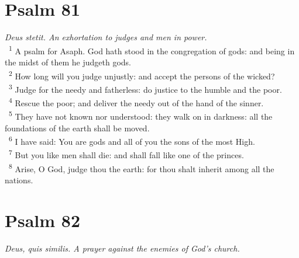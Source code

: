 \documentclass[a5paper,12pt]{article}
\begin{document}
\begin{multicols*}{2}
\section{Psalm 81}
\label{sec:org1b11241}
\emph{Deus stetit. An exhortation to judges and men in power.}\\

~\textsuperscript{1} A psalm for Asaph. God hath stood in the congregation of gods: and being in the midst of them he judgeth gods.\\
~\textsuperscript{2} How long will you judge unjustly: and accept the persons of the wicked?\\
~\textsuperscript{3} Judge for the needy and fatherless: do justice to the humble and the poor.\\
~\textsuperscript{4} Rescue the poor; and deliver the needy out of the hand of the sinner.\\
~\textsuperscript{5} They have not known nor understood: they walk on in darkness: all the foundations of the earth shall be moved.\\
~\textsuperscript{6} I have said: You are gods and all of you the sons of the most High.\\
~\textsuperscript{7} But you like men shall die: and shall fall like one of the princes.\\
~\textsuperscript{8} Arise, O God, judge thou the earth: for thou shalt inherit among all the nations.\\

\section{Psalm 82}
\label{sec:org0f40417}
\emph{Deus, quis similis. A prayer against the enemies of God's church.}\\


\end{multicols*}
\end{document}
